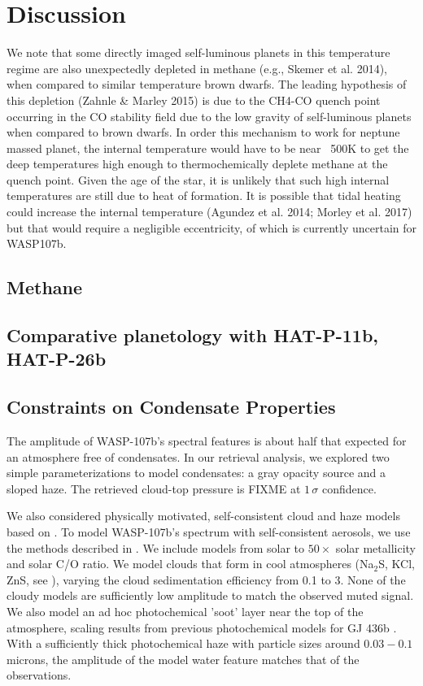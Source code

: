 \documentclass[twocolumn]{aastex61}
\begin{document}
\section{Discussion} \label{sec:discuss}


We note that some directly imaged self-luminous planets in this
temperature regime are also unexpectedly depleted in methane (e.g.,
Skemer et al. 2014), when compared to similar temperature brown
dwarfs.   The leading hypothesis of this depletion (Zahnle & Marley
2015) is due to the CH4-CO quench point occurring in the CO stability
field due to the low gravity of self-luminous planets when compared to
brown dwarfs.  In order this mechanism to work for neptune massed
planet, the internal temperature would have to be near ~500K to get
the deep temperatures high enough to thermochemically deplete methane
at the quench point. Given the age of the star, it is unlikely that
such high internal temperatures are still due to heat of formation. It
is possible that tidal heating could increase the internal temperature
(Agundez et al. 2014; Morley et al. 2017) but that would require a
negligible eccentricity, of which is currently uncertain for WASP107b.


\subsection{Methane}

\subsection{Comparative planetology with HAT-P-11b, HAT-P-26b}

\subsection{Constraints on Condensate Properties}
The amplitude of WASP-107b's spectral features is about half that expected for an atmosphere free of condensates. In our retrieval analysis, we explored two simple parameterizations to model condensates: a gray opacity source and a sloped haze.  The retrieved cloud-top pressure is FIXME at $1\,\sigma$ confidence.

We also considered physically motivated, self-consistent cloud and haze models based on .  To model WASP-107b's spectrum with self-consistent aerosols, we use the methods described in \citep{fortney08, morley15}. We include models from solar to $50\times$ solar metallicity and solar C/O ratio. We model clouds that form in cool atmospheres (Na$_2$S, KCl, ZnS, see \citealt{morley12}), varying the cloud sedimentation efficiency from 0.1 to 3. None of the cloudy models are sufficiently low amplitude to match the observed muted signal. We also model an ad hoc photochemical 'soot' layer near the top of the atmosphere, scaling results from previous photochemical models for GJ 436b \citep{line11, morley17}. With a sufficiently thick photochemical haze with particle sizes around $0.03-0.1$ microns, the amplitude of the model water feature matches that of the observations. 
\end{document}
